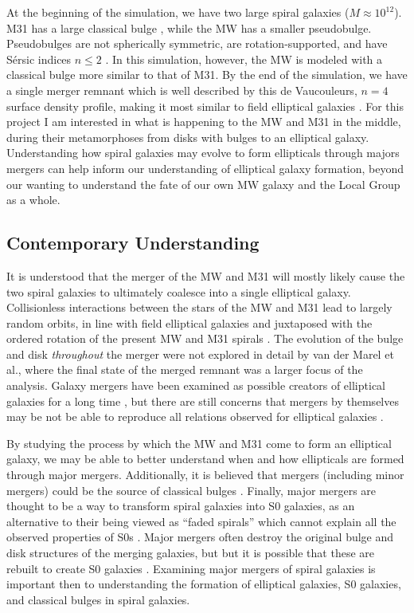 \documentclass[twocolumn]{aastex631}
\begin{document}
At the beginning of the simulation, we have two large spiral galaxies ($M \approx 10^{12}$). M31 has a large classical bulge \citep{kormendy2010}, while the MW has a smaller pseudobulge. Pseudobulges are not spherically symmetric, are rotation-supported, and have S\'{e}rsic indices $n \le 2$ \citep{brooks2016}. In this simulation, however, the MW is modeled with a classical bulge more similar to that of M31. By the end of the simulation, we have a single merger remnant which is well described by this de Vaucouleurs, $n=4$ surface density profile, making it most similar to field elliptical galaxies \citep{paper3}. For this project I am interested in what is happening to the MW and M31 in the middle, during their metamorphoses from disks with bulges to an elliptical galaxy. Understanding how spiral galaxies may evolve to form ellipticals through majors mergers can help inform our understanding of elliptical galaxy formation, beyond our wanting to understand the fate of our own MW galaxy and the Local Group as a whole.

\subsection{Contemporary Understanding}
It is understood that the merger of the MW and M31 will mostly likely cause the two spiral galaxies to ultimately coalesce into a single elliptical galaxy. Collisionless interactions between the stars of the MW and M31 lead to largely random orbits, in line with field elliptical galaxies and juxtaposed with the ordered rotation of the present MW and M31 spirals \citep{paper3}. The evolution of the bulge and disk \emph{throughout} the merger were not explored in detail by van der Marel et al., where the final state of the merged remnant was a larger focus of the analysis. Galaxy mergers have been examined as possible creators of elliptical galaxies for a long time \citep{toomre1977}, but there are still concerns that mergers by themselves may be not be able to reproduce all relations observed for elliptical galaxies \citep{brooks2016}. 

By studying the process by which the MW and M31 come to form an elliptical galaxy, we may be able to better understand when and how ellipticals are formed through major mergers. Additionally, it is believed that mergers (including minor mergers) could be the source of classical bulges \citep{brooks2016}. Finally, major mergers are thought to be a way to transform spiral galaxies into S0 galaxies, as an alternative to their being viewed as ``faded spirals'' which cannot explain all the observed properties of S0s \citep{querejeta2015II}. Major mergers often destroy the original bulge and disk structures of the merging galaxies, but but it is possible that these are rebuilt to create S0 galaxies \citep{querejeta2015I}. Examining major mergers of spiral galaxies is important then to understanding the formation of elliptical galaxies, S0 galaxies, and classical bulges in spiral galaxies.
\end{document}
